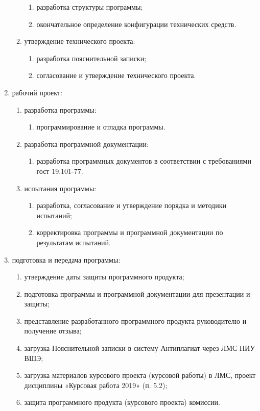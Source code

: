 \begin{enumerate}
\begin{enumerate}
\begin{enumerate}
            \item разработка структуры программы;
            \item окончательное определение конфигурации технических средств.
        \end{enumerate}
        \item утверждение технического проекта:
        \begin{enumerate}
            \item разработка пояснительной записки;
            \item согласование и утверждение технического проекта.
        \end{enumerate}
    \end{enumerate}
    \item рабочий проект:
    \begin{enumerate}
        \item разработка программы:
        \begin{enumerate}
            \item программирование и отладка программы.
        \end{enumerate}
        \item разработка программной документации:
        \begin{enumerate}
            \item разработка программных документов в соответствии с требованиями гост 19.101-77.
        \end{enumerate}
        \item испытания программы:
        \begin{enumerate}
            \item разработка, согласование и утверждение порядка и методики испытаний;
            \item корректировка программы и программной документации по результатам испытаний.
        \end{enumerate}
    \end{enumerate}
    \item подготовка и передача программы:
    \begin{enumerate}
        \item утверждение даты защиты программного продукта;
        \item подготовка программы и программной документации для презентации и защиты;
        \item представление разработанного программного продукта руководителю и получение отзыва;
        \item загрузка Пояснительной записки в систему Антиплагиат через ЛМС НИУ ВШЭ;
        \item загрузка материалов курсового проекта (курсовой работы) в ЛМС, проект дисциплины «Курсовая работа 2019» (п. 5.2);
        \item защита программного продукта (курсового проекта) комиссии.
    \end{enumerate}
\end{enumerate}

